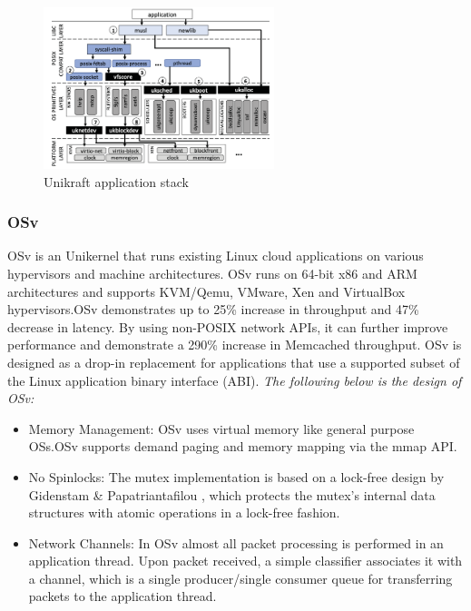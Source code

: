 \begin{figure}[htbp!] 
  \centering    
  \includegraphics[width=0.6\textwidth]{UnikraftStack}
  \caption[Unikraft]{Unikraft application stack \cite{Unikraft}}
  \label{fig:UnikraftStack}
  \end{figure}

\subsubsection{OSv \cite{OSvPaper}}
OSv is an Unikernel that runs existing Linux cloud applications on various hypervisors 
and machine architectures. OSv runs on 64-bit x86 and
ARM architectures and supports KVM/Qemu, VMware, Xen and VirtualBox 
hypervisors.OSv demonstrates up to 25\% increase in throughput and 47\% 
decrease in latency. 
By using non-POSIX network APIs,
it can further improve performance and demonstrate a
290\% increase in Memcached throughput.
OSv is designed as a drop-in replacement for applications that use a
supported subset of the Linux application binary interface (ABI).
\emph{The following below is the design of OSv:}
\begin{itemize}
  \item Memory Management: OSv uses virtual memory like
  general purpose OSs.OSv supports demand paging and memory mapping
  via the mmap API.
  \item No Spinlocks: The mutex implementation is based on a lock-free design 
  by Gidenstam \& Papatriantafilou \cite{LockFree}, which protects
  the mutex's internal data structures with atomic operations in a lock-free fashion.
  \item Network Channels: In OSv almost all packet processing is performed in an application thread. 
  Upon packet received, a simple classifier associates it with a channel, which is a single producer/single
  consumer queue for transferring packets to the application thread.
\end{itemize}

